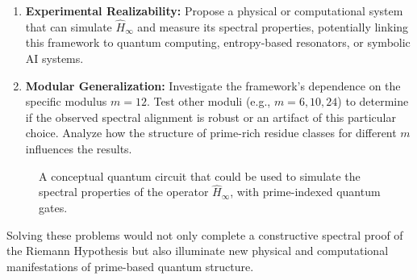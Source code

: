 \begin{enumerate}
  \item \textbf{Experimental Realizability:}  
  Propose a physical or computational system that can simulate \( \hat{H}_\infty \) and measure its spectral properties, potentially linking this framework to quantum computing, entropy-based resonators, or symbolic AI systems.
  \item \textbf{Modular Generalization:}
  Investigate the framework's dependence on the specific modulus \(m=12\). Test other moduli (e.g., \(m=6, 10, 24\)) to determine if the observed spectral alignment is robust or an artifact of this particular choice. Analyze how the structure of prime-rich residue classes for different \(m\) influences the results.
\end{enumerate}

\begin{figure}[h]
\centering
{}
\caption{A conceptual quantum circuit that could be used to simulate the spectral properties of the operator $\hat{H}_\infty$, with prime-indexed quantum gates.}
\label{fig:quantum_circuit}
\end{figure}

Solving these problems would not only complete a constructive spectral proof of the Riemann Hypothesis but also illuminate new physical and computational manifestations of prime-based quantum structure.